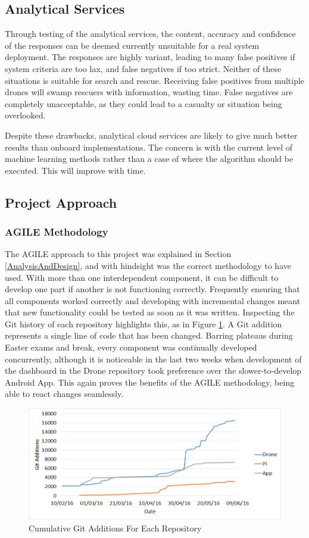 \documentclass{article}
\begin{document}
\subsection{Analytical Services}
Through testing of the analytical services, the content, accuracy and confidence of the responses can be deemed currently unsuitable for a real system deployment. The responses are highly variant, leading to many false positives if system criteria are too lax, and false negatives if too strict. Neither of these situations is suitable for search and rescue. Receiving false positives from multiple drones will swamp rescuers with information, wasting time. False negatives are completely unacceptable, as they could lead to a casualty or situation being overlooked.   

Despite these drawbacks, analytical cloud services are likely to give much better results than onboard implementations. The concern is with the current level of machine learning methods rather than a case of where the algorithm should be executed. This will improve with time.

\subsection{Project Approach}
\subsubsection{AGILE Methodology}
The AGILE approach to this project was explained in Section \ref{AnalysisAndDesign}, and with hindsight was the correct methodology to have used. With more than one interdependent component, it can be difficult to develop one part if another is not functioning correctly. Frequently ensuring that all components worked correctly and developing with incremental changes meant that new functionality could be tested as soon as it was written. Inspecting the Git history of each repository highlights this, as in Figure \ref{fig:GitAnalysis}. A Git addition represents a single line of code that has been changed. Barring plateaus during Easter exams and break, every component was continually developed concurrently, although it is noticeable in the last two weeks when development of the dashboard in the Drone repository took preference over the slower-to-develop Android App. This again proves the benefits of the AGILE methodology, being able to react changes seamlessly.

\begin{figure}[h]
\centering
\caption{Cumulative Git Additions For Each Repository\label{fig:GitAnalysis}}
\includegraphics[width=\textwidth]{GitAnalysis}
\end{figure}
\end{document}
